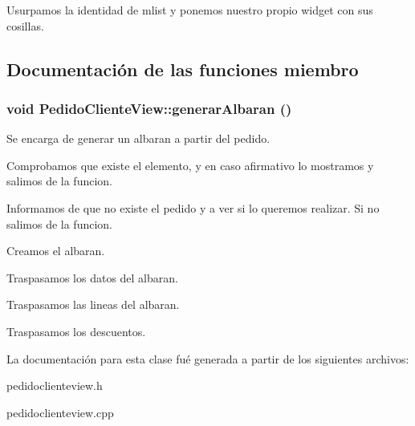 Usurpamos la identidad de mlist y ponemos nuestro propio widget con sus cosillas. 

\subsection{Documentaci\'{o}n de las funciones miembro}
\subsubsection{\setlength{\rightskip}{0pt plus 5cm}void Pedido\-Cliente\-View::generar\-Albaran ()}\label{classPedidoClienteView_a2}


Se encarga de generar un albaran a partir del pedido. 

Comprobamos que existe el elemento, y en caso afirmativo lo mostramos y salimos de la funcion.

Informamos de que no existe el pedido y a ver si lo queremos realizar. Si no salimos de la funcion.

Creamos el albaran.

Traspasamos los datos del albaran.

Traspasamos las lineas del albaran.

Traspasamos los descuentos. 

La documentaci\'{o}n para esta clase fu\'{e} generada a partir de los siguientes archivos:\begin{CompactItemize}
\item 
pedidoclienteview.h\item 
pedidoclienteview.cpp\end{CompactItemize}
